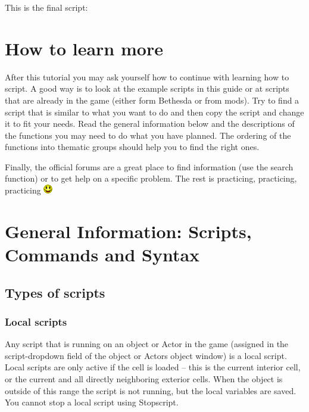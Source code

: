 \documentclass[
]{article}
\begin{document}
This is the final script:



\hypertarget{how-to-learn-more}{%
\section{How to learn more}\label{how-to-learn-more}}

After this tutorial you may ask yourself how to continue with learning
how to script. A good way is to look at the example scripts in this
guide or at scripts that are already in the game (either form Bethesda
or from mods). Try to find a script that is similar to what you want to
do and then copy the script and change it to fit your needs. Read the
general information below and the descriptions of the functions you may
need to do what you have planned. The ordering of the functions into
thematic groups should help you to find the right ones.

Finally, the official forums are a great place to find information (use
the search function) or to get help on a specific problem. The rest is
practicing, practicing, practicing \includegraphics{media/image5.png}

\hypertarget{general-information-scripts-commands-and-syntax}{%
\section{\texorpdfstring{\hfill\break
General Information: Scripts, Commands and
Syntax}{ General Information: Scripts, Commands and Syntax}}\label{general-information-scripts-commands-and-syntax}}

\hypertarget{types-of-scripts}{%
\subsection{Types of scripts}\label{types-of-scripts}}

\hypertarget{local-scripts}{%
\subsubsection{Local scripts}\label{local-scripts}}

Any script that is running on an object or Actor in the game (assigned
in the script-dropdown field of the object or Actors object window) is a
local script. Local scripts are only active if the cell is loaded --
this is the current interior cell, or the current and all directly
neighboring exterior cells. When the object is outside of this range the
script is not running, but the local variables are saved. You cannot
stop a local script using Stopscript.
\end{document}
